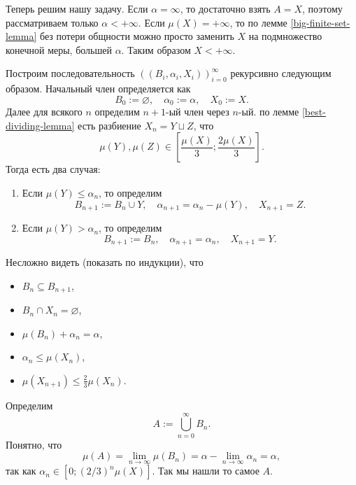 \documentclass[12pt,a4paper]{article}
\begin{document}
\begin{enumproblem}
        Теперь решим нашу задачу. Если $\alpha = \infty$, то достаточно взять $A = X$, поэтому рассматриваем только $\alpha < +\infty$. Если $\mu(X) = +\infty$, то по лемме \ref{big-finite-set-lemma} без потери общности можно просто заменить $X$ на подмножество конечной меры, большей $\alpha$. Таким образом $X < +\infty$.

        Построим последовательность $((B_i, \alpha_i, X_i))_{i=0}^\infty$ рекурсивно следующим образом. Начальный член определяется как
        \[B_0 := \varnothing, \quad \alpha_0 := \alpha, \quad X_0 := X.\]
        Далее для всякого $n$ определим $n+1$-ый член через $n$-ый. по лемме \ref{best-dividing-lemma} есть разбиение $X_n = Y \sqcup Z$, что
        \[\mu(Y), \mu(Z) \in \left[\frac{\mu(X)}{3}; \frac{2\mu(X)}{3}\right].\]
        Тогда есть два случая:
        \begin{enumerate}
            \item Если $\mu(Y) \leqslant \alpha_n$, то определим
                \[B_{n+1} := B_n \cup Y, \quad \alpha_{n+1} = \alpha_n - \mu(Y), \quad X_{n+1} = Z.\]
            \item Если $\mu(Y) > \alpha_n$, то определим
                \[B_{n+1} := B_n, \quad \alpha_{n+1} = \alpha_n, \quad X_{n+1} = Y.\]
        \end{enumerate}
        Несложно видеть (показать по индукции), что
        \begin{itemize}
            \item $B_n \subseteq B_{n+1}$,
            \item $B_n \cap X_n = \varnothing$,
            \item $\mu(B_n) + \alpha_n = \alpha$,
            \item $\alpha_n \leqslant \mu(X_n)$,
            \item $\mu(X_{n+1}) \leqslant \frac{2}{3} \mu(X_n)$.
        \end{itemize}
        Определим
        \[A := \bigcup_{n=0}^\infty B_n.\]
        Понятно, что
        \[\mu(A) = \lim_{n \to \infty} \mu(B_n) = \alpha - \lim_{n \to \infty} \alpha_n = \alpha,\]
        так как $\alpha_n \in [0; (2/3)^n \mu(X)]$. Так мы нашли то самое $A$.
    \end{enumproblem}
\end{document}
